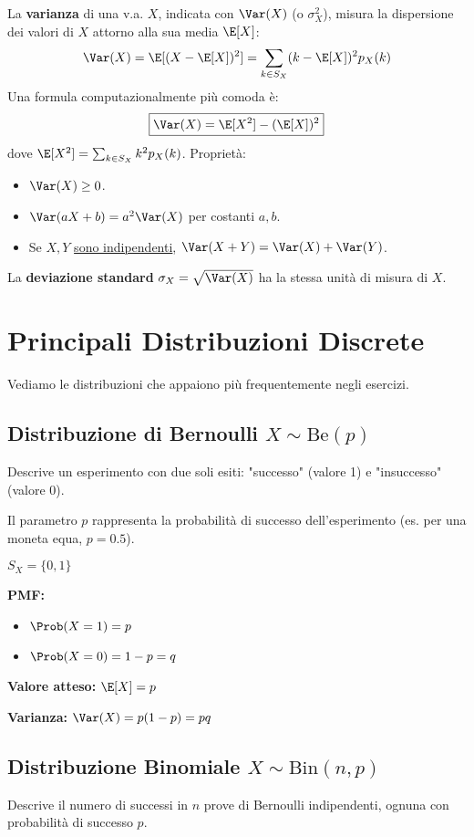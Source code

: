 \begin{definition}[Varianza]\label{def:varianza}
La \textbf{varianza} di una v.a. $X$, indicata con $\Var(X)$ (o $\sigma_X^2$), misura la dispersione dei valori di $X$ attorno alla sua media $\E[X]$:
\[ \Var(X) = \E[(X - \E[X])^2] = \sum_{k \in S_X} (k - \E[X])^2 p_X(k) \]
Una formula computazionalmente più comoda è:
\[ \boxed{\Var(X) = \E[X^2] - (\E[X])^2} \]
dove $\E[X^2] = \sum_{k \in S_X} k^2 p_X(k)$.
Proprietà:
\begin{itemize}
    \item $\Var(X) \ge 0$.
    \item $\Var(aX+b) = a^2 \Var(X)$ per costanti $a,b$.
    \item Se $X, Y$ \underline{sono indipendenti}, $\Var(X+Y) = \Var(X) + \Var(Y)$.
\end{itemize}
La \textbf{deviazione standard} $\sigma_X = \sqrt{\Var(X)}$ ha la stessa unità di misura di $X$.
\end{definition}

\section{Principali Distribuzioni Discrete}
Vediamo le distribuzioni che appaiono più frequentemente negli esercizi.

\subsection{Distribuzione di Bernoulli \texorpdfstring{$X \sim \text{Be}(p)$}{X ~ Be(p)}}
Descrive un esperimento con due soli esiti: "successo" (valore 1) e "insuccesso" (valore 0).

Il parametro $p$ rappresenta la probabilità di successo dell'esperimento (es. per una moneta equa, $p=0.5$).

$S_X = \{0, 1\}$

\textbf{PMF:}
\begin{itemize}
    \item $\Prob(X=1) = p$
    \item $\Prob(X=0) = 1-p = q$
\end{itemize}

\textbf{Valore atteso:} $\E[X] = p$

\textbf{Varianza:} $\Var(X) = p(1-p) = pq$

\subsection{Distribuzione Binomiale \texorpdfstring{$X \sim \text{Bin}(n,p)$}{X ~ Bin(n,p)}}
Descrive il numero di successi in $n$ prove di Bernoulli indipendenti, ognuna con probabilità di successo $p$.

